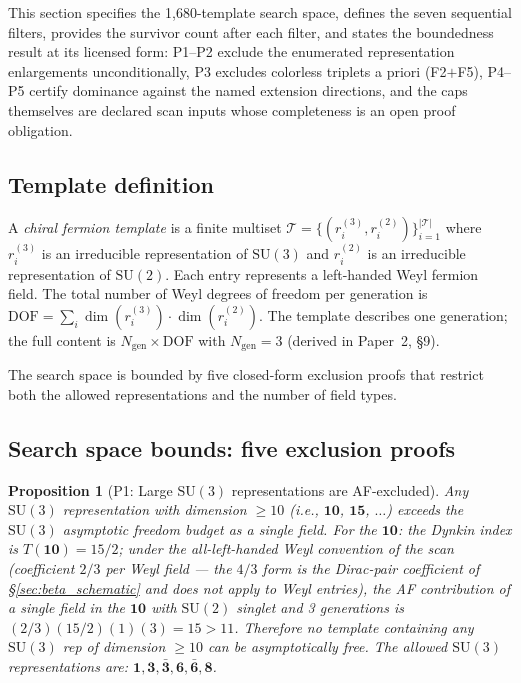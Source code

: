 \documentclass[11pt]{article}
\newtheorem{proposition}[theorem]{Proposition}
\theoremstyle{definition}
\newcommand{\SU}{\mathrm{SU}}
\begin{document}
This section specifies the 1{,}680-template search space, defines the
seven sequential filters, provides the survivor count after each
filter, and states the boundedness result at its licensed form:
P1--P2 exclude the enumerated representation enlargements
unconditionally, P3 excludes colorless triplets a priori (F2$+$F5),
P4--P5 certify dominance against the named extension directions, and
the caps themselves are declared scan inputs whose completeness is an
open proof obligation.


\subsection{Template definition}
\label{sec:template_def}

A \emph{chiral fermion template} is a finite multiset
$\mathcal{T} = \{(r_i^{(3)}, r_i^{(2)})\}_{i=1}^{|\mathcal{T}|}$
where $r_i^{(3)}$ is an irreducible representation of $\SU(3)$ and
$r_i^{(2)}$ is an irreducible representation of $\SU(2)$.  Each entry
represents a left-handed Weyl fermion field.  The total number of Weyl
degrees of freedom per generation is
$\mathrm{DOF} = \sum_i \dim(r_i^{(3)}) \cdot \dim(r_i^{(2)})$.
The template describes one generation; the full content is
$N_{\mathrm{gen}} \times \mathrm{DOF}$ with $N_{\mathrm{gen}} = 3$
(derived in Paper~2, \S9).

The search space is bounded by five closed-form exclusion proofs that
restrict both the allowed representations and the number of field types.


\subsection{Search space bounds: five exclusion proofs}
\label{sec:exclusion_proofs}

\begin{proposition}[P1: Large $\SU(3)$ representations are AF-excluded]
\label{prop:P1}
Any $\SU(3)$ representation with dimension $\ge 10$ (i.e.,
$\mathbf{10}$, $\mathbf{15}$, $\ldots$) exceeds the $\SU(3)$
asymptotic freedom budget as a single field.  For the $\mathbf{10}$:
the Dynkin index is $T(\mathbf{10}) = 15/2$; under the all-left-handed
Weyl convention of the scan (coefficient $2/3$ per Weyl field --- the
$4/3$ form is the Dirac-pair coefficient of \S\ref{sec:beta_schematic}
and does not apply to Weyl entries), the AF contribution of a single
field in the $\mathbf{10}$ with $\SU(2)$ singlet and 3 generations is
$(2/3)(15/2)(1)(3) = 15 > 11$.
Therefore no template containing any $\SU(3)$ rep of dimension
$\ge 10$ can be asymptotically free.  The allowed $\SU(3)$
representations are: $\mathbf{1}, \mathbf{3}, \bar{\mathbf{3}},
\mathbf{6}, \bar{\mathbf{6}}, \mathbf{8}$.
\end{proposition}
\end{document}
